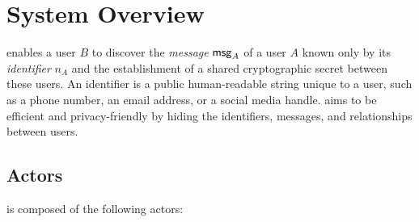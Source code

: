 \section{System Overview} \label{sec:overview}
\sysname enables a user $B$ to discover the \textit{message} $\mathsf{msg}_A$ of a user $A$ known only by its \textit{identifier} $n_A$ and the establishment of a shared cryptographic secret between these users. An identifier is a public human-readable string unique to a user, such as a phone number, an email address, or a social media handle. \sysname aims to be efficient and privacy-friendly by hiding the identifiers, messages, and relationships between users.

\subsection{Actors}
\sysname is composed of the following actors:
